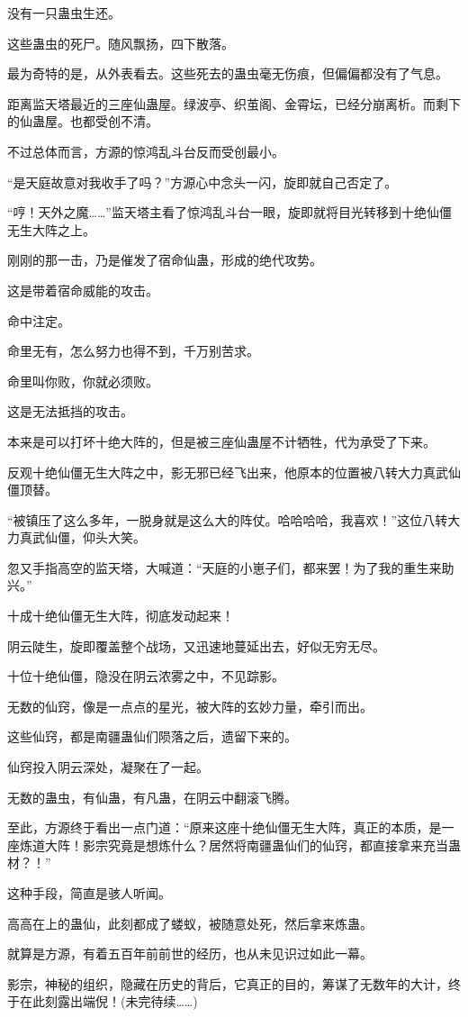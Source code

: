 \begin{this_body}
没有一只蛊虫生还。

这些蛊虫的死尸。随风飘扬，四下散落。

最为奇特的是，从外表看去。这些死去的蛊虫毫无伤痕，但偏偏都没有了气息。

距离监天塔最近的三座仙蛊屋。绿波亭、织茧阁、金霄坛，已经分崩离析。而剩下的仙蛊屋。也都受创不清。

不过总体而言，方源的惊鸿乱斗台反而受创最小。

“是天庭故意对我收手了吗？”方源心中念头一闪，旋即就自己否定了。

“哼！天外之魔……”监天塔主看了惊鸿乱斗台一眼，旋即就将目光转移到十绝仙僵无生大阵之上。

刚刚的那一击，乃是催发了宿命仙蛊，形成的绝代攻势。

这是带着宿命威能的攻击。

命中注定。

命里无有，怎么努力也得不到，千万别苦求。

命里叫你败，你就必须败。

这是无法抵挡的攻击。

本来是可以打坏十绝大阵的，但是被三座仙蛊屋不计牺牲，代为承受了下来。

反观十绝仙僵无生大阵之中，影无邪已经飞出来，他原本的位置被八转大力真武仙僵顶替。

“被镇压了这么多年，一脱身就是这么大的阵仗。哈哈哈哈，我喜欢！”这位八转大力真武仙僵，仰头大笑。

忽又手指高空的监天塔，大喊道：“天庭的小崽子们，都来罢！为了我的重生来助兴。”

十成十绝仙僵无生大阵，彻底发动起来！

阴云陡生，旋即覆盖整个战场，又迅速地蔓延出去，好似无穷无尽。

十位十绝仙僵，隐没在阴云浓雾之中，不见踪影。

无数的仙窍，像是一点点的星光，被大阵的玄妙力量，牵引而出。

这些仙窍，都是南疆蛊仙们陨落之后，遗留下来的。

仙窍投入阴云深处，凝聚在了一起。

无数的蛊虫，有仙蛊，有凡蛊，在阴云中翻滚飞腾。

至此，方源终于看出一点门道：“原来这座十绝仙僵无生大阵，真正的本质，是一座炼道大阵！影宗究竟是想炼什么？居然将南疆蛊仙们的仙窍，都直接拿来充当蛊材？！”

这种手段，简直是骇人听闻。

高高在上的蛊仙，此刻都成了蝼蚁，被随意处死，然后拿来炼蛊。

就算是方源，有着五百年前前世的经历，也从未见识过如此一幕。

影宗，神秘的组织，隐藏在历史的背后，它真正的目的，筹谋了无数年的大计，终于在此刻露出端倪！(未完待续……)

\end{this_body}

